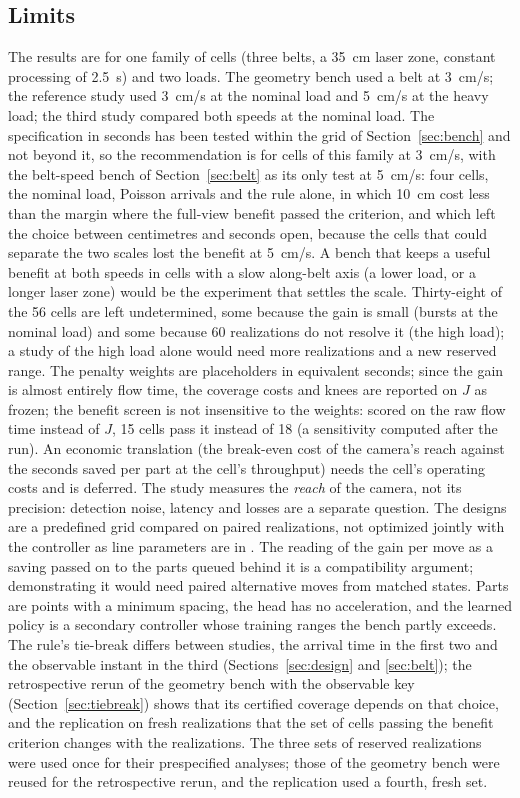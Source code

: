 \documentclass[11pt,a4paper]{article}
\begin{document}
\subsection{Limits}\label{sec:limits}
The results are for one family of cells (three belts, a 35~cm laser zone, constant
processing of 2.5~s) and two loads. The geometry bench used a belt at 3~cm/s; the
reference study used 3~cm/s at the nominal load and 5~cm/s at the heavy load; the third
study compared both speeds at the nominal load. The specification in seconds has been
tested within the grid of Section~\ref{sec:bench} and not beyond it, so the
recommendation is for cells of this family at 3~cm/s, with the belt-speed bench of
Section~\ref{sec:belt} as its only test at 5~cm/s: four cells, the nominal load, Poisson
arrivals and the rule alone, in which 10~cm cost less than the margin where the
full-view benefit passed the criterion, and which left the choice between centimetres and seconds open,
because the cells that could separate the two scales lost the benefit at 5~cm/s. A bench
that keeps a useful benefit at both speeds in cells with a slow along-belt axis (a lower
load, or a longer laser zone) would be the experiment that settles the scale. Thirty-eight of the
56 cells are left undetermined, some because the gain is small (bursts at the nominal
load) and some because 60 realizations do not resolve it (the high load); a study of the
high load alone would need more realizations and a new reserved range. The penalty
weights are placeholders in equivalent seconds; since the gain is almost entirely flow
time, the coverage costs and knees are reported on $J$ as frozen; the benefit screen is
not insensitive to the weights: scored on the raw flow time instead of $J$, 15 cells pass
it instead of 18 (a sensitivity computed after the run). An economic translation (the break-even
cost of the camera's reach against the seconds saved per part at the cell's throughput)
needs the cell's operating costs and is deferred. The study measures the \emph{reach} of
the camera, not its precision: detection noise, latency and losses are a separate
question. The designs are a predefined grid compared on paired realizations, not optimized
jointly with the controller as line parameters are in \cite{Sarker2001}. The reading of the
gain per move as a saving passed on to the parts queued behind it is a compatibility
argument; demonstrating it would need paired alternative moves from matched states. Parts
are points with a minimum spacing, the head has no acceleration, and the learned policy is a
secondary controller whose training ranges the bench partly exceeds.
The rule's tie-break differs between studies, the arrival time in the first two and the
observable instant in the third (Sections~\ref{sec:design} and \ref{sec:belt}); the
retrospective rerun of the geometry bench with the observable key
(Section~\ref{sec:tiebreak}) shows that its certified coverage depends on that choice, and
the replication on fresh realizations that the set of cells passing the benefit criterion
changes with the realizations. The three sets of reserved realizations were used once for
their prespecified analyses; those of the geometry bench were reused for the retrospective
rerun, and the replication used a fourth, fresh set.
\end{document}
